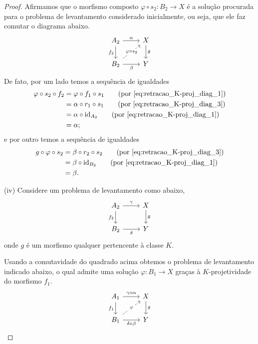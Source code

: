 \begin{proof}
  Afirmamos que o morfismo composto $\varphi \circ s_2: B_2 \to X$ é a solução procurada para o problema de levantamento considerado inicialmente, ou seja, que ele faz comutar o diagrama abaixo.
  \begin{displaymath}
    \begin{tikzcd}
      A_2
      \arrow[r, "\alpha"]
      \arrow[d, "f_2" swap]
      & X
      \arrow[d, "g"]
      \\ B_2
      \arrow[r, "\beta" swap]
      \arrow[ru, dashed, "\varphi \circ s_2" description]
      & Y
    \end{tikzcd}
  \end{displaymath}
  De fato, por um lado temos a sequência de igualdades
  \begin{align*}
    \varphi \circ s_2 \circ f_2
    & = \varphi \circ f_1 \circ s_1
    \tag{por \eqref{eq:retracao_K-proj_diag_1}} \\
    & = \alpha \circ r_1 \circ s_1
    \tag{por \eqref{eq:retracao_K-proj_diag_3}} \\
    & = \alpha \circ \id_{A_2}
    \tag{por \eqref{eq:retracao_K-proj_diag_1}} \\
    & = \alpha;
  \end{align*}
  e por outro temos a sequência de igualdades
  \begin{align*}
    g \circ \varphi \circ s_2
    & = \beta \circ r_2 \circ s_2
    \tag{por \eqref{eq:retracao_K-proj_diag_3}} \\
    & = \beta \circ \id_{B_2}
    \tag{por \eqref{eq:retracao_K-proj_diag_1}} \\
    & = \beta.
  \end{align*}

  \smallskip
  (iv) Considere um problema de levantamento como abaixo,
  \begin{equation}\label{eq:pushout_K-proj_diag_1}
    \begin{tikzcd}
      A_2
      \arrow[r, "\gamma"]
      \arrow[d, "f_2" swap]
      & X
      \arrow[d, "g"]
      \\ B_2
      \arrow[r, "\delta" swap]
      & Y
    \end{tikzcd}
  \end{equation}
  onde $g$ é um morfismo qualquer pertencente à classe $K$.

  Usando a comutavidade do quadrado acima obtemos o problema de levantamento indicado abaixo, o qual admite uma solução $\varphi: B_1 \to X$ graças à $K$-projetividade do morfismo $f_1$.
  \begin{equation}\label{eq:pushout_K-proj_diag_2}
    \begin{tikzcd}
      A_1
      \arrow[r, "\gamma \circ \alpha"]
      \arrow[d, "f_1" swap]
      & X
      \arrow[d, "g"]
      \\ B_1
      \arrow[r, "\delta \circ \beta" swap]
      \arrow[ru, dashed, "\varphi" description]
      & Y
    \end{tikzcd}
  \end{equation}


\end{proof}
